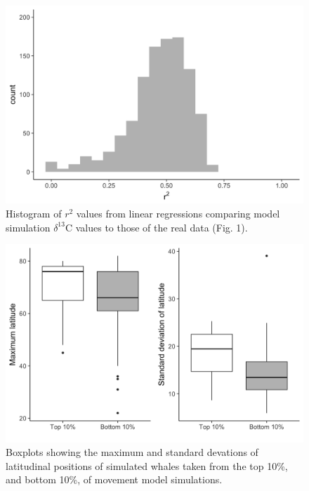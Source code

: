\documentclass[a4paper,12pt]{article}
\begin{document}
  \begin{figure}[!htbp]
    \centering
      \includegraphics[width=\linewidth]{figures/Figure-S5-r2.png}
      \caption{Histogram of $r^2$ values from linear regressions comparing model simulation $\delta^{13}$C values to those of the real data (Fig. 1).} %
      \label{figs6}
  \end{figure}

    \begin{figure}[!htbp]
    \centering
      \includegraphics[width=\linewidth]{figures/Figure-S6-boxplots.png}
      \caption{Boxplots showing the maximum and standard devations of latitudinal positions of simulated whales taken from the top 10\%, and bottom 10\%, of movement model simulations.} %
      \label{figs7}
  \end{figure}
\end{document}
